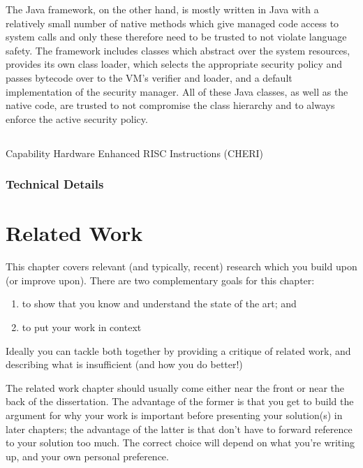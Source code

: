 \documentclass[a4paper,12pt,twoside,openright]{report}
\begin{document}
The Java framework, on the other hand, is mostly written in Java with a relatively small number of native methods which give managed code access to system calls and only these therefore need to be trusted to not violate language safety. The framework includes classes which abstract over the system resources, provides its own class loader, which selects the appropriate security policy and passes bytecode over to the VM's verifier and loader, and a default implementation of the security manager. All of these Java classes, as well as the native code, are trusted to not compromise the class hierarchy and to always enforce the active security policy.

\section{}



Capability Hardware Enhanced RISC Instructions (CHERI)

\subsection{Technical Details}

\chapter{Related Work} 

This chapter covers relevant (and typically, recent) research 
which you build upon (or improve upon). There are two complementary 
goals for this chapter: 
\begin{enumerate} 
  \item to show that you know and understand the state of the art; and 
  \item to put your work in context
\end{enumerate} 

Ideally you can tackle both together by providing a critique of
related work, and describing what is insufficient (and how you do
better!)

The related work chapter should usually come either near the front or
near the back of the dissertation. The advantage of the former is that
you get to build the argument for why your work is important before
presenting your solution(s) in later chapters; the advantage of the
latter is that don't have to forward reference to your solution too
much. The correct choice will depend on what you're writing up, and
your own personal preference.
\end{document}
